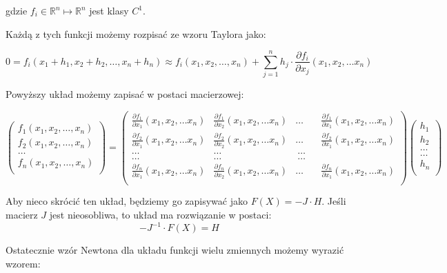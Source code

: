\documentclass{article}
\begin{document}
gdzie $f_i \in \mathbb{R}^n \mapsto \mathbb{R}^n$ jest klasy $C^{1}$.

Każdą z tych funkcji możemy rozpisać ze wzoru Taylora jako:

$$0 = f_i(x_1 + h_1, x_2 + h_2, \ldots, x_n + h_n) \approx f_i(x_1, x_2, \ldots, x_n) + \sum_{j=1}^n h_j \cdot \frac{\partial f_i}{\partial x_j} (x_1, x_2, \ldots x_n)$$

Powyższy układ możemy zapisać w postaci macierzowej:

$$
\begin{pmatrix}
f_1(x_1, x_2, \ldots, x_n)\\ 
f_2(x_1, x_2, \ldots, x_n)\\ 
\ldots\\ 
f_n(x_1, x_2, \ldots, x_n)\\ 

\end{pmatrix} = \begin{pmatrix}
\frac{\partial f_1}{\partial x_1}(x_1, x_2, \ldots x_n) & \frac{\partial f_1}{\partial x_2}(x_1, x_2, \ldots x_n) &  \ldots &  & \frac{\partial f_1}{\partial x_1}(x_1, x_2, \ldots x_n) \\ 
\frac{\partial f_2}{\partial x_1}(x_1, x_2, \ldots x_n) & \frac{\partial f_2}{\partial x_2}(x_1, x_2, \ldots x_n) &  \ldots &  & \frac{\partial f_2}{\partial x_1}(x_1, x_2, \ldots x_n) \\ 
 \ldots & \ldots &  \ \ldots & \\ 
 \ldots & \ldots &  \ \ldots & \\ 
\frac{\partial f_n}{\partial x_1}(x_1, x_2, \ldots x_n) & \frac{\partial f_n}{\partial x_2}(x_1, x_2, \ldots x_n) &  \ldots &  & \frac{\partial f_n}{\partial x_1}(x_1, x_2, \ldots x_n) \\ 
\end{pmatrix} \begin{pmatrix}
h_1\\ 
h_2\\ 
\ldots \\ 
\ldots \\ 
h_n\\ 

\end{pmatrix}
$$

Aby nieco skrócić ten układ, będziemy go zapisywać jako $F(X) = -J \cdot H$.
Jeśli macierz $J$ jest nieosobliwa, to układ ma rozwiązanie w postaci:
$$ -J^{-1} \cdot F(X) = H$$

Ostatecznie wzór Newtona dla układu funkcji wielu zmiennych możemy wyrazić wzorem:
\end{document}
